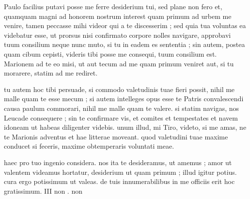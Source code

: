 


 Paulo facilius putavi posse me ferre desiderium tui, sed plane non fero et, quamquam magni ad honorem nostrum interest quam primum ad urbem me venire, tamen peccasse mihi videor qui a te discesserim ; sed quia tua voluntas ea videbatur esse, ut prorsus nisi confirmato corpore nolles navigare, approbavi tuum consilium neque nunc muto, si tu in eadem es sententia ; sin autem, postea quam cibum cepisti, videris tibi posse me consequi, tuum consilium est. Marionem ad te eo misi, ut aut tecum ad me quam primum veniret aut, si tu morarere, statim ad me rediret.

 tu autem hoc tibi persuade, si commodo valetudinis tuae fieri possit, nihil me malle quam te esse mecum ; si autem intelleges opus esse te Patris convalescendi causa paulum commorari, nihil me malle quam te valere. si statim navigas, nos Leucade consequere ; sin te confirmare vis, et comites et tempestates et navem idoneam ut habeas diligenter videbis. unum illud, mi Tiro, videto, si me amas, ne te Marionis adventus et hae litterae moveant. quod valetudini tuae maxime conducet si feceris, maxime obtemperaris voluntati meae.

 haec pro tuo ingenio considera. nos ita te desideramus, ut amemus ; amor ut valentem videamus hortatur, desiderium ut quam primum ; illud igitur potius. cura ergo potissimum ut valeas. de tuis innumerabilibus in me officiis erit hoc gratissimum. III non . non
